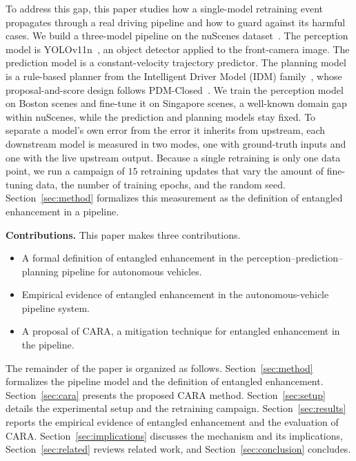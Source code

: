 \documentclass[conference]{IEEEtran}
\begin{document}
To address this gap, this paper studies how a single-model retraining event
propagates through a real driving pipeline and how to guard against its harmful
cases. We build a three-model pipeline on the nuScenes
dataset~\cite{caesar2020nuscenes}. The perception model is
YOLOv11n~\cite{jocher2024yolo11}, an object detector applied to the front-camera
image. The prediction model is a constant-velocity trajectory predictor. The
planning model is a rule-based planner from the Intelligent Driver Model (IDM)
family~\cite{treiber2000idm}, whose proposal-and-score design follows
PDM-Closed~\cite{dauner2023parting}. We train the perception model on Boston
scenes and fine-tune it on Singapore scenes, a well-known domain gap within
nuScenes, while the prediction and planning models stay fixed. To separate a
model's own error from the error it inherits from upstream, each downstream model
is measured in two modes, one with ground-truth inputs and one with the live
upstream output. Because a single retraining is only one data point, we run a
campaign of $15$ retraining updates that vary the amount of fine-tuning data, the
number of training epochs, and the random seed. Section~\ref{sec:method}
formalizes this measurement as the definition of entangled enhancement in a
pipeline.

\vspace{2pt}
\noindent\textbf{Contributions.} This paper makes three contributions.
\begin{itemize}[leftmargin=*, itemsep=2pt, topsep=2pt]
\item A formal definition of entangled enhancement in the
perception--prediction--planning pipeline for autonomous vehicles.
\item Empirical evidence of entangled enhancement in the autonomous-vehicle
pipeline system.
\item A proposal of CARA, a mitigation technique for entangled enhancement in the
pipeline.
\end{itemize}

The remainder of the paper is organized as follows.
Section~\ref{sec:method} formalizes the pipeline model and the definition of
entangled enhancement. Section~\ref{sec:cara} presents the proposed CARA method.
Section~\ref{sec:setup} details the experimental setup and the retraining
campaign. Section~\ref{sec:results} reports the empirical evidence of entangled
enhancement and the evaluation of CARA.
Section~\ref{sec:implications} discusses the mechanism and its implications,
Section~\ref{sec:related} reviews related work, and
Section~\ref{sec:conclusion} concludes.
\end{document}
